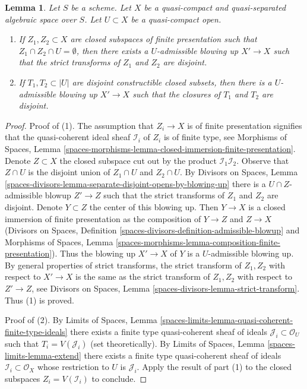 \documentclass[10pt,a4paper]{amsart}
\theoremstyle{plain}
\newtheorem{lemma}[subsection]{Lemma}
\theoremstyle{definition}
\theoremstyle{remark}
\numberwithin{equation}{subsection}
\begin{document}
\begin{lemma}
\label{lemma-separate-disjoint-locally-closed-by-blowing-up}
Let $S$ be a scheme.
Let $X$ be a quasi-compact and quasi-separated algebraic space over $S$.
Let $U \subset X$ be a quasi-compact open.
\begin{enumerate}
\item If $Z_1, Z_2 \subset X$ are closed subspaces of finite
presentation such that $Z_1 \cap Z_2 \cap U = \emptyset$, then
there exists a $U$-admissible blowing up $X' \to X$
such that the strict transforms of $Z_1$ and $Z_2$ are disjoint.
\item If $T_1, T_2 \subset |U|$ are disjoint constructible closed
subsets, then there is a $U$-admissible blowing up $X' \to X$
such that the closures of $T_1$ and $T_2$ are disjoint.
\end{enumerate}
\end{lemma}

\begin{proof}
Proof of (1). The assumption that $Z_i \to X$ is of finite presentation
signifies that the quasi-coherent ideal sheaf $\mathcal{I}_i$ of $Z_i$
is of finite type, see 
Morphisms of Spaces, Lemma
\ref{spaces-morphisms-lemma-closed-immersion-finite-presentation}.
Denote $Z \subset X$ the closed subspace
cut out by the product $\mathcal{I}_1 \mathcal{I}_2$.
Observe that $Z \cap U$ is the disjoint union
of $Z_1 \cap U$ and $Z_2 \cap U$. By Divisors on Spaces, Lemma
\ref{spaces-divisors-lemma-separate-disjoint-opens-by-blowing-up}
there is a $U \cap Z$-admissible blowup $Z' \to Z$ such that
the strict transforms of $Z_1$ and $Z_2$ are disjoint.
Denote $Y \subset Z$ the center of this blowing up.
Then $Y \to X$ is a closed immersion of finite presentation as the composition
of $Y \to Z$ and $Z \to X$ (Divisors on Spaces, Definition
\ref{spaces-divisors-definition-admissible-blowup} and
Morphisms of Spaces, Lemma
\ref{spaces-morphisms-lemma-composition-finite-presentation}).
Thus the blowing up $X' \to X$ of $Y$ is a $U$-admissible blowing
up. By general properties of strict transforms, the
strict transform of $Z_1, Z_2$ with respect to $X' \to X$
is the same as the strict transform of $Z_1, Z_2$ with respect
to $Z' \to Z$, see
Divisors on Spaces, Lemma \ref{spaces-divisors-lemma-strict-transform}.
Thus (1) is proved.

\medskip\noindent
Proof of (2). By Limits of Spaces, Lemma
\ref{spaces-limits-lemma-quasi-coherent-finite-type-ideals}
there exists a finite type quasi-coherent sheaf of ideals
$\mathcal{J}_i \subset \mathcal{O}_U$ such that
$T_i = V(\mathcal{J}_i)$ (set theoretically).
By Limits of Spaces, Lemma \ref{spaces-limits-lemma-extend}
there exists a finite type quasi-coherent sheaf
of ideals $\mathcal{I}_i \subset \mathcal{O}_X$
whose restriction to $U$ is $\mathcal{J}_i$.
Apply the result of part (1) to the closed
subspaces $Z_i = V(\mathcal{I}_i)$ to conclude.
\end{proof}
\end{document}
